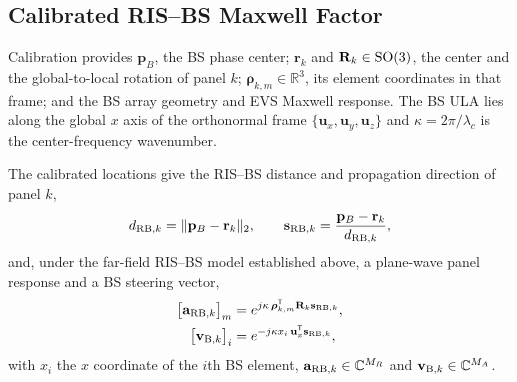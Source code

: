 \documentclass[letterpaper,journal]{IEEEtran}
\newcommand{\R}{\mathbb{R}}
\newcommand{\C}{\mathbb{C}}
\newcommand{\bp}{\mathbf{p}}
\newcommand{\ba}{\mathbf{a}}
\newcommand{\bv}{\mathbf{v}}
\newcommand{\br}{\mathbf{r}}
\newcommand{\bs}{\mathbf{s}}
\newcommand{\bu}{\mathbf{u}}
\newcommand{\bR}{\mathbf{R}}
\newcommand{\brho}{\boldsymbol{\rho}}
\begin{document}
\subsection{Calibrated RIS--BS Maxwell Factor}
\label{subsec:calibrated}

Calibration provides $\bp_B$, the BS phase center; $\br_k$ and
$\bR_k\in{\rm SO}(3)$, the center and the global-to-local rotation of panel
$k$; $\brho_{k,m}\in\R^3$, its element coordinates in that frame; and the BS
array geometry and EVS Maxwell response. The BS ULA lies along the global $x$ axis of the
orthonormal frame $\{\bu_x,\bu_y,\bu_z\}$ and
$\kappa=2\pi/\lambda_c$ is the center-frequency wavenumber.

The calibrated locations give the RIS--BS distance and propagation direction
of panel $k$,
\begin{equation}
	d_{{\rm RB},k}=\|\bp_B-\br_k\|_2,
	\qquad
	\bs_{{\rm RB},k}=\frac{\bp_B-\br_k}{d_{{\rm RB},k}},
	\label{eq:rbgeom}
\end{equation}
and, under the far-field RIS--BS model established above, a plane-wave panel
response and a BS steering vector,
\begin{align}
	\big[\ba_{{\rm RB},k}\big]_m
	&=e^{j\kappa\,\brho_{k,m}^{\mathsf T}\bR_k\bs_{{\rm RB},k}},\nonumber\\
	\big[\bv_{{\rm B},k}\big]_i
	&=e^{-j\kappa x_i\,\bu_x^{\mathsf T}\bs_{{\rm RB},k}},
	\label{eq:arb_vb}
\end{align}
with $x_i$ the $x$ coordinate of the $i$th BS element,
$\ba_{{\rm RB},k}\in\C^{M_R}$ and $\bv_{{\rm B},k}\in\C^{M_A}$.
\end{document}
